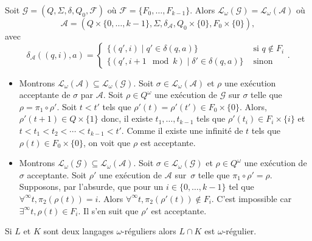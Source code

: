 \documentclass[./main]{subfiles}
\begin{document}
  \begin{thm}
    Soit $\mathcal{G} = (Q, \Sigma, \delta, Q_0, \mathcal{F})$ où $\mathcal{F} = \{F_0, \ldots, F_{k-1}\}$.
    Alors $\mathcal{L}_\omega(\mathcal{G}) = \mathcal{L}_\omega(\mathcal{A})$ où
    \[
    \mathcal{A} = (Q \times \{0,\ldots,k-1\}, \Sigma, \delta_\mathcal{A}, Q_0 \times \{0\}, F_0 \times \{0\})
    ,\] 
    avec
    \[
    \delta_\mathcal{A}((q, i), a) = \begin{cases}
      \{(q', i)  \mid q' \in \delta(q, a)\} & \text{ si }q \not\in F_i \\
      \{(q', i+1 \mod k)  \mid \delta' \in \delta(q, a)\}  & \text{ sinon}
    \end{cases}
    .\] 
  \end{thm}
  \begin{prv}
    \begin{itemize}
      \item Montrons $\mathcal{L}_\omega(\mathcal{A}) \subseteq \mathcal{L}_\omega(\mathcal{G})$.
        Soit $\sigma \in \mathcal{L}_\omega(\mathcal{A})$ et $\rho$ une exécution acceptante de $\sigma$ par $\mathcal{A}$.
        Soit $\rho \in Q^\omega$ une exécution de $\mathcal{G}$ sur $\sigma$ telle que $\rho = \pi_1 \circ \rho'$.
        Soit $t <t'$ tels que $\rho'(t) = \rho'(t') \in F_0 \times \{0\}$.
        Alors, $\rho'(t+1) \in Q \times \{1\}$ donc, il existe $t_1, \ldots, t_{k-1}$ tels que $\rho'(t_i) \in F_i \times \{i\}$ et $t < t_1 < t_2 < \cdots < t_{k-1} < t'$.
        Comme il existe une infinité de $t$ tels que $\rho(t) \in F_0 \times \{0\}$, on voit que $\rho$ est acceptante.
      \item Montrons $\mathcal{L}_\omega(\mathcal{G}) \subseteq \mathcal{L}_\omega(\mathcal{A})$.
        Soit $\sigma \in \mathcal{L}_\omega(\mathcal{G})$ et $\rho \in Q^\omega$ une exécution de $\sigma$ acceptante.
        Soit $\rho'$ une exécution de $\mathcal{A}$ sur~$\sigma$ telle que $\pi_1 \circ \rho' = \rho$.
        Supposons, par l'absurde, que pour un $i \in \{0, \ldots, k-1\}$ tel que $\forall^\infty t, \pi_2(\rho(t)) = i$.
        Alors $\forall^\infty t, \pi_2(\rho'(t)) \not\in F_i$.
        C'est impossible car $\exists ^\infty t, \rho(t) \in F_i$.
        Il s'en suit que $\rho'$ est acceptante.
    \end{itemize}
  \end{prv}

  \begin{crlr}
    Si $L$ et $K$ sont deux langages $\omega$-réguliers alors $L \cap K$ est $\omega$-régulier.
  \end{crlr}
\end{document}
